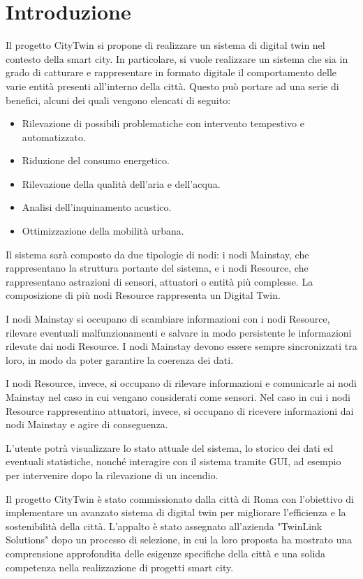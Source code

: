 \chapter{Introduzione}
Il progetto CityTwin si propone di realizzare un sistema di digital twin nel contesto della smart city. In particolare, si vuole realizzare un sistema che sia in grado di catturare e rappresentare in formato digitale il comportamento delle varie entità presenti all'interno della città. Questo può portare ad una serie di benefici, alcuni dei quali vengono elencati di seguito:

\begin{itemize}
    \item Rilevazione di possibili problematiche con intervento tempestivo e automatizzato.
    \item Riduzione del consumo energetico.
    \item Rilevazione della qualità dell'aria e dell'acqua.
    \item Analisi dell'inquinamento acustico.
    \item Ottimizzazione della mobilità urbana.
\end{itemize}

Il sistema sarà composto da due tipologie di nodi: i nodi Mainstay, che rappresentano la struttura portante del sistema, e i nodi Resource, che rappresentano astrazioni di sensori, attuatori o entità più complesse. La composizione di più nodi Resource rappresenta un Digital Twin.

I nodi Mainstay si occupano di scambiare informazioni con i nodi Resource, rilevare eventuali malfunzionamenti e salvare in modo persistente le informazioni rilevate dai nodi Resource. I nodi Mainstay devono essere sempre sincronizzati tra loro, in modo da poter garantire la coerenza dei dati.

I nodi Resource, invece, si occupano di rilevare informazioni e comunicarle ai nodi Mainstay nel caso in cui vengano considerati come sensori. Nel caso in cui i nodi Resource rappresentino attuatori, invece, si occupano di ricevere informazioni dai nodi Mainstay e agire di conseguenza.

L'utente potrà visualizzare lo stato attuale del sistema, lo storico dei dati ed eventuali statistiche, nonché interagire con il sistema tramite GUI, ad esempio per intervenire dopo la rilevazione di un incendio.

Il progetto CityTwin è stato commissionato dalla città di Roma con l'obiettivo di implementare un avanzato sistema di digital twin per migliorare l'efficienza e la sostenibilità della città. L'appalto è stato assegnato all'azienda "TwinLink Solutions" dopo un processo di selezione, in cui la loro proposta ha mostrato una comprensione approfondita delle esigenze specifiche della città e una solida competenza nella realizzazione di progetti smart city.

